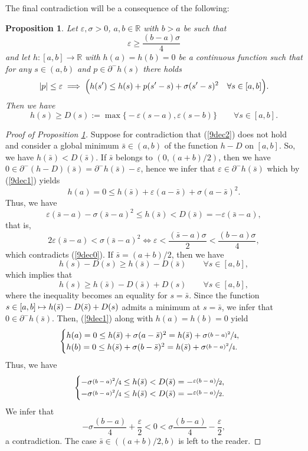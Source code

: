 \documentclass[JEP,XML,SOM,Unicode,NoFloatCountersInSection,published]{cedram}
\newcommand\mto{\mathchoice{\longmapsto}{\mapsto}{\mapsto}{\mapsto}}
\let\epsilon\varepsilon
\newcommand\R{\mathbb R}
\newtheorem{proposition}[theorem]{Proposition}
\theoremstyle{definition}
\begin{document}
The final contradiction will be a consequence of the following:

\begin{proposition}\label{PROPSTEP5}
Let $\epsilon, \sigma>0$, $a,b \in \R$ with $b>a$ be such that
\begin{equation}\label{9dec0}
\epsilon \geq \frac{(b-a)\sigma}{4}
\end{equation}
and let $h:[a,b]\to \R$ with $h(a)=h(b)=0$ be a continuous function such that for any $s\in (a,b)$ and $p\in \partial^-h(s)$ there holds
\begin{equation}\label{9dec1}
|p| \leq \epsilon \implies \Bigl(h(s') \leq h(s) + p (s'-s)+\sigma (s'-s)^2 \quad \forall s \in [a,b]\Bigr).
\end{equation}
Then we have
\begin{equation}\label{9dec2}
h(s) \geq D(s):= \max\bigl\{-\epsilon (s-a), \epsilon (s-b)\bigr\} \qquad \forall s \in [a,b].
\end{equation}
\end{proposition}
\begin{proof}[Proof of Proposition \ref{PROPSTEP5}]
Suppose for contradiction that (\ref{9dec2}) does not hold and consider a global minimum $\bar{s} \in (a,b)$ of the function $h-D$ on $[a,b]$. So, we have $h(\bar{s})<D(\bar{s})$. If $\bar{s}$ belongs to $(0,(a+b)/2)$, then we have $0\in \partial^-(h-D)(\bar{s})= \partial^-h(\bar{s})-\epsilon$, hence we infer that $\epsilon \in \partial^-h(\bar{s})$ which by (\ref{9dec1}) yields
\[
h(a) =0 \leq h(\bar{s}) + \epsilon (a-\bar{s}) + \sigma (a-\bar{s})^2.
\]
Thus, we have
\[
\epsilon (\bar{s}-a) - \sigma (\bar{s}-a)^2 \leq h(\bar{s}) < D(\bar{s}) = -\epsilon (\bar{s}-a),
\]
that is,
\[
2 \epsilon (\bar{s}-a) < \sigma (\bar{s}-a)^2 \iff \epsilon < \frac{(\bar{s}-a)\sigma}{2} < \frac{(b-a)\sigma}{4},
\]
which contradicts (\ref{9dec0}). If $\bar{s}=(a+b)/2$, then we have
\[
h(s)-D(s) \geq h(\bar{s})-D(\bar{s}) \qquad \forall s \in [a,b],
\]
which implies that
\[
h(s) \geq h(\bar{s})-D(\bar{s}) + D(s) \qquad \forall s \in [a,b],
\]
where the inequality becomes an equality for $s=\bar{s}$. Since the function $s\in [a,b] \mto h(\bar{s})-D(\bar{s}) + D(s)$ admits a minimum at $s=\bar{s}$, we infer that $0\in \partial^-h(\bar{s})$. Then, (\ref{9dec1}) along with $h(a)=h(b)=0$ yield
\[
\begin{cases}
h(a) = 0 \leq h(\bar{s}) + \sigma (a-\bar{s})^2 = h(\bar{s}) + \sigma \sfrac{(b-a)^2}{4}, \\
h(b) = 0 \leq h(\bar{s}) + \sigma (b-\bar{s})^2 = h(\bar{s}) + \sigma \sfrac{(b-a)^2}{4}.
\end{cases}
\]
Thus, we have
\[
\begin{cases}
- \sigma \sfrac{(b-a)^2}{4} \leq h(\bar{s}) < D(\bar{s}) = -\sfrac{\epsilon(b-a)}{2}, \\
- \sigma \sfrac{(b-a)^2}{4} \leq h(\bar{s}) < D(\bar{s}) = -\sfrac{\epsilon(b-a)}{2}.
\end{cases}
\]
We infer that
\[
- \sigma \frac{(b-a)}{4} +\frac{\epsilon}{2} < 0 < \sigma \frac{(b-a)}{4} -\frac{\epsilon}{2},
\]
a contradiction. The case $\bar{s} \in ((a+b)/2,b)$ is left to the reader.
\end{proof}
\end{document}
